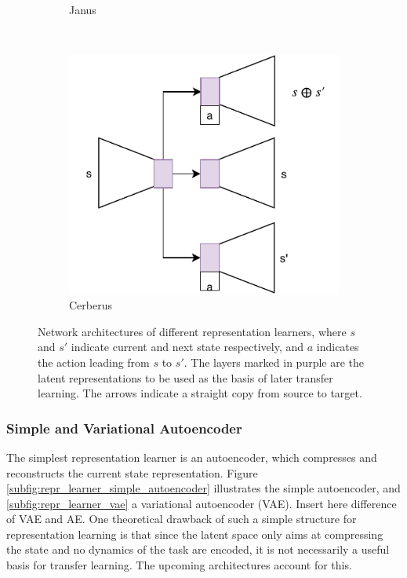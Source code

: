 \begin{figure}[ht!]
\begin{subfigure}{0.5\columnwidth}
		\caption{Janus}
		\label{subfig:repr_learner_janus}
	\end{subfigure}%
	~ 
	\begin{subfigure}{0.5\columnwidth}
		\centering
		\includegraphics[width=\linewidth]{img/cerberus.pdf}
		\caption{Cerberus}
		\label{subfig:repr_learner_cerberus}
	\end{subfigure}
	\caption{Network architectures of different representation learners, where $s$ and $s'$ indicate current and next state respectively, and $a$ indicates the action leading from $s$ to $s'$. 
	The layers marked in purple are the latent representations to be used as the basis of later transfer learning. 
	The arrows indicate a straight copy from source to target.
	}
	\label{fig:repr_learner}
\end{figure}

\subsubsection{Simple and Variational Autoencoder}
The simplest representation learner is an autoencoder, which compresses and reconstructs the current state representation. 
Figure \ref{subfig:repr_learner_simple_autoencoder} illustrates the simple autoencoder, and \ref{subfig:repr_learner_vae} a variational autoencoder (VAE). 
Insert here difference of VAE and AE. 
One theoretical drawback of such a simple structure for representation learning is that since the latent space only aims at compressing the state and no dynamics of the task are encoded, it is not necessarily a useful basis for transfer learning.
The upcoming architectures account for this.

